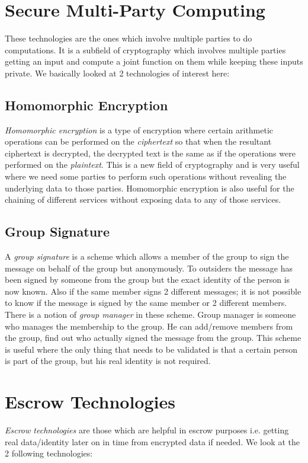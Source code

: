 \section{Secure Multi-Party Computing}
These technologies are the ones which involve multiple parties to do computations\cite{goldreich1998secure}. It is a subfield of cryptography which involves multiple parties getting an input and compute a joint function on them while keeping these inputs private. We basically looked at 2 technologies of interest here:
\subsection{Homomorphic Encryption}
\textit{Homomorphic encryption}\cite{rappe2005homomorphic} is a type of encryption where certain arithmetic operations can be performed on the \textit{ciphertext} so that when the resultant ciphertext is decrypted, the decrypted text is the same as if the operations were performed on the \textit{plaintext}. This is a new field of cryptography and is very useful where we need some parties to perform such operations without revealing the underlying data to those parties. Homomorphic encryption is also useful for the chaining of different services without exposing data to any of those services.
\subsection{Group Signature}
A \textit{group signature}\cite{ateniese2000practical} is a scheme which allows a member of the group to sign the message on behalf of the group but anonymously. To outsiders the message has been signed by someone from the group but the exact identity of the person is now known. Also if the same member signs 2 different messages; it is not possible to know if the message is signed by the same member or 2 different members. There is a notion of \textit{group manager} in these scheme. Group manager is someone who manages the membership to the group. He can add/remove members from the group, find out who actually signed the message from the group. This scheme is useful where the only thing that needs to be validated is that a certain person is part of the group, but his real identity is not required.
\section{Escrow Technologies}
\textit{Escrow technologies} are those which are helpful in escrow purposes i.e. getting real data/identity later on in time from encrypted data if needed. We look at the 2 following technologies:
